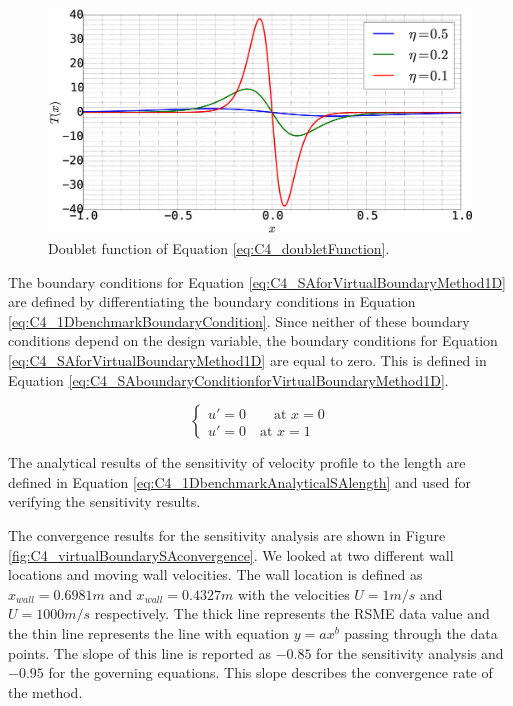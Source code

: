 \begin{figure}[H]
    \centering
    \includegraphics[width=12.00cm]{Chapter_4/figure/doubletFunction.eps}
    \caption{Doublet function of Equation \eqref{eq:C4_doubletFunction}.}
    \label{fig:C4_doubletFunction}
\end{figure}

The boundary conditions for Equation \eqref{eq:C4_SAforVirtualBoundaryMethod1D} are defined by differentiating the boundary conditions in Equation \eqref{eq:C4_1DbenchmarkBoundaryCondition}. Since neither of these boundary conditions depend on the design variable, the boundary conditions for Equation \eqref{eq:C4_SAforVirtualBoundaryMethod1D} are equal to zero. This is defined in Equation \eqref{eq:C4_SAboundaryConditionforVirtualBoundaryMethod1D}.

\begin{equation}\label{eq:C4_SAboundaryConditionforVirtualBoundaryMethod1D}
\begin{cases}
    u' = 0 \qquad \text{at } x = 0 \\
    u' = 0 \quad \text{at } x = 1
\end{cases}
\end{equation}

The analytical results of the sensitivity of velocity profile to the length are defined in Equation \eqref{eq:C4_1DbenchmarkAnalyticalSAlength} and used for verifying the sensitivity results.

The convergence results for the sensitivity analysis are shown in Figure \ref{fig:C4_virtualBoundarySAconvergence}. We looked at two different wall locations and moving wall velocities. The wall location is defined as $x_{wall} = 0.6981 m$ and $x_{wall} = 0.4327 m$ with the velocities $U = 1 m/s$ and $U = 1000 m/s$ respectively. The thick line represents the RSME data value and the thin line represents the line with equation $y = ax^b$ passing through the data points. The slope of this line is reported as $-0.85$ for the sensitivity analysis and $-0.95$ for the governing equations. This slope describes the convergence rate of the method.

